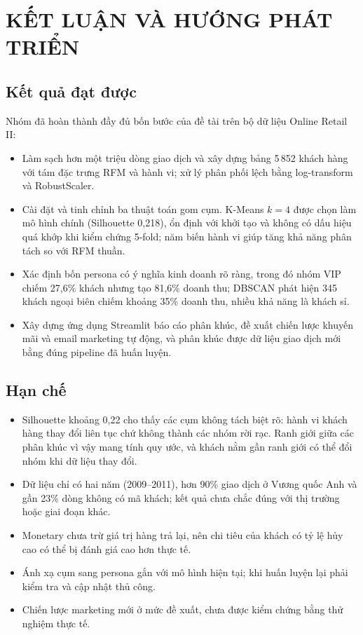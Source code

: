 \documentclass[../report.tex]{subfiles}
\begin{document}
\newpage
\section{KẾT LUẬN VÀ HƯỚNG PHÁT TRIỂN}
\label{sec:conclusion}

\subsection{Kết quả đạt được}

Nhóm đã hoàn thành đầy đủ bốn bước của đề tài trên bộ dữ liệu Online Retail II:
\begin{itemize}[leftmargin=1.5em]
\item Làm sạch hơn một triệu dòng giao dịch và xây dựng bảng 5\,852 khách hàng với tám đặc trưng RFM và hành vi; xử lý phân phối lệch bằng log-transform và RobustScaler.
\item Cài đặt và tinh chỉnh ba thuật toán gom cụm. K-Means $k=4$ được chọn làm mô hình chính (Silhouette 0,218), ổn định với khởi tạo và không có dấu hiệu quá khớp khi kiểm chứng 5-fold; năm biến hành vi giúp tăng khả năng phân tách so với RFM thuần.
\item Xác định bốn persona có ý nghĩa kinh doanh rõ ràng, trong đó nhóm VIP chiếm 27,6\% khách nhưng tạo 81,6\% doanh thu; DBSCAN phát hiện 345 khách ngoại biên chiếm khoảng 35\% doanh thu, nhiều khả năng là khách sỉ.
\item Xây dựng ứng dụng Streamlit báo cáo phân khúc, đề xuất chiến lược khuyến mãi và email marketing tự động, và phân khúc được dữ liệu giao dịch mới bằng đúng pipeline đã huấn luyện.
\end{itemize}

\subsection{Hạn chế}

\begin{itemize}[leftmargin=1.5em]
\item Silhouette khoảng 0,22 cho thấy các cụm không tách biệt rõ: hành vi khách hàng thay đổi liên tục chứ không thành các nhóm rời rạc. Ranh giới giữa các phân khúc vì vậy mang tính quy ước, và khách nằm gần ranh giới có thể đổi nhóm khi dữ liệu thay đổi.
\item Dữ liệu chỉ có hai năm (2009--2011), hơn 90\% giao dịch ở Vương quốc Anh và gần 23\% dòng không có mã khách; kết quả chưa chắc đúng với thị trường hoặc giai đoạn khác.
\item Monetary chưa trừ giá trị hàng trả lại, nên chi tiêu của khách có tỷ lệ hủy cao có thể bị đánh giá cao hơn thực tế.
\item Ánh xạ cụm sang persona gắn với mô hình hiện tại; khi huấn luyện lại phải kiểm tra và cập nhật thủ công.
\item Chiến lược marketing mới ở mức đề xuất, chưa được kiểm chứng bằng thử nghiệm thực tế.
\end{itemize}
\end{document}
